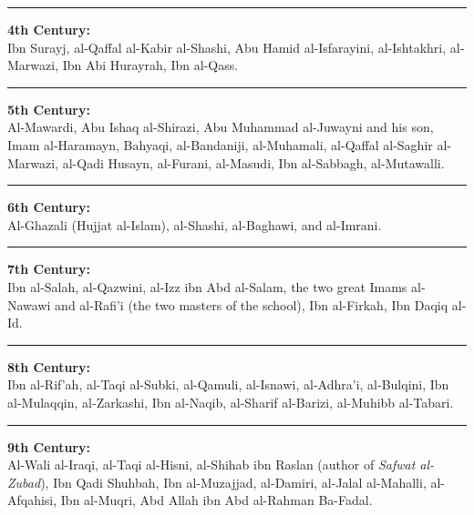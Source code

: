 \documentclass[
  a4paper,
  DIV=11,
  numbers=noendperiod]{scrartcl}
\begin{document}
\begin{center}\rule{0.5\linewidth}{0.5pt}\end{center}

\textbf{4th Century:}\\
Ibn Surayj, al-Qaffal al-Kabir al-Shashi, Abu Hamid al-Isfarayini,
al-Ishtakhri, al-Marwazi, Ibn Abi Hurayrah, Ibn al-Qass.

\begin{center}\rule{0.5\linewidth}{0.5pt}\end{center}

\textbf{5th Century:}\\
Al-Mawardi, Abu Ishaq al-Shirazi, Abu Muhammad al-Juwayni and his son,
Imam al-Haramayn, Bahyaqi, al-Bandaniji, al-Muhamali, al-Qaffal
al-Saghir al-Marwazi, al-Qadi Husayn, al-Furani, al-Masudi, Ibn
al-Sabbagh, al-Mutawalli.

\begin{center}\rule{0.5\linewidth}{0.5pt}\end{center}

\textbf{6th Century:}\\
Al-Ghazali (Hujjat al-Islam), al-Shashi, al-Baghawi, and al-Imrani.

\begin{center}\rule{0.5\linewidth}{0.5pt}\end{center}

\textbf{7th Century:}\\
Ibn al-Salah, al-Qazwini, al-Izz ibn Abd al-Salam, the two great Imams
al-Nawawi and al-Rafi'i (the two masters of the school), Ibn al-Firkah,
Ibn Daqiq al-Id.

\begin{center}\rule{0.5\linewidth}{0.5pt}\end{center}

\textbf{8th Century:}\\
Ibn al-Rif'ah, al-Taqi al-Subki, al-Qamuli, al-Isnawi, al-Adhra'i,
al-Bulqini, Ibn al-Mulaqqin, al-Zarkashi, Ibn al-Naqib, al-Sharif
al-Barizi, al-Muhibb al-Tabari.

\begin{center}\rule{0.5\linewidth}{0.5pt}\end{center}

\textbf{9th Century:}\\
Al-Wali al-Iraqi, al-Taqi al-Hisni, al-Shihab ibn Raslan (author of
\emph{Safwat al-Zubad}), Ibn Qadi Shuhbah, Ibn al-Muzajjad, al-Damiri,
al-Jalal al-Mahalli, al-Afqahisi, Ibn al-Muqri, Abd Allah ibn Abd
al-Rahman Ba-Fadal.
\end{document}
